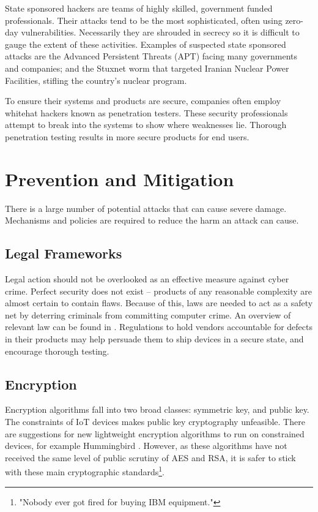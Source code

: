 \documentclass[10pt,journal,compsoc]{IEEEtran}
\begin{document}
State sponsored hackers are teams of highly skilled, government funded
professionals. Their attacks tend to be the most sophisticated, often using
zero-day vulnerabilities. Necessarily they are shrouded in secrecy so it is
difficult to gauge the extent of these activities. Examples of suspected state
sponsored attacks are the Advanced Persistent Threats (APT) facing many
governments and companies; and the Stuxnet worm that targeted Iranian Nuclear
Power Facilities, stifling the country's nuclear program.  

To ensure their systems and products are secure, companies often employ
whitehat hackers known as penetration testers. These security professionals
attempt to break into the systems to show where weaknesses lie. Thorough
penetration testing results in more secure products for end users.

\section{Prevention and Mitigation} 
There is a large number of potential attacks that can cause severe damage.
Mechanisms and policies are required to reduce the harm an attack can cause. 

\subsection{Legal Frameworks}
Legal action should not be overlooked as an effective measure against cyber
crime. Perfect security does not exist \cite{ThereMustBeA} -- products of any
reasonable complexity are almost certain to contain flaws. Because of this,
laws are needed to act as a safety net by deterring criminals from committing
computer crime. An overview of relevant law can be found in \cite{Weber2010}.
Regulations to hold vendors accountable for defects in their products may help
persuade them to ship devices in a secure state, and encourage thorough
testing. 

\subsection{Encryption}
Encryption algorithms fall into two broad classes: symmetric key, and public
key. The constraints of IoT devices makes public key cryptography unfeasible.
There are  suggestions for new lightweight encryption algorithms to run on
constrained devices, for example Hummingbird \cite{Sion2010}.  However, as
these algorithms have not received the same level of public scrutiny of AES and
RSA, it is safer to stick with these main cryptographic
standards\footnote{"Nobody ever got fired for buying IBM equipment."}. 
\end{document}
